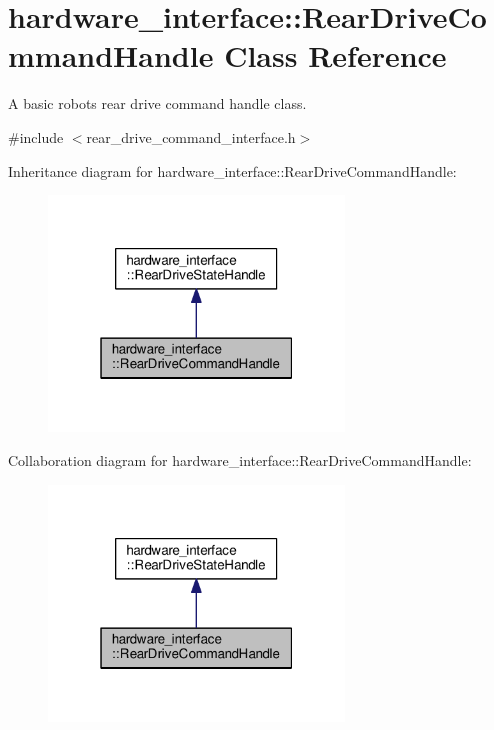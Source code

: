 \hypertarget{classhardware__interface_1_1RearDriveCommandHandle}{}\section{hardware\+\_\+interface\+:\+:Rear\+Drive\+Command\+Handle Class Reference}
\label{classhardware__interface_1_1RearDriveCommandHandle}


A basic robot\textquotesingle{}s rear drive command handle class.  




{\ttfamily \#include $<$rear\+\_\+drive\+\_\+command\+\_\+interface.\+h$>$}



Inheritance diagram for hardware\+\_\+interface\+:\+:Rear\+Drive\+Command\+Handle\+:\nopagebreak
\begin{figure}[H]
\begin{center}
\leavevmode
\includegraphics[width=223pt]{classhardware__interface_1_1RearDriveCommandHandle__inherit__graph}
\end{center}
\end{figure}


Collaboration diagram for hardware\+\_\+interface\+:\+:Rear\+Drive\+Command\+Handle\+:\nopagebreak
\begin{figure}[H]
\begin{center}
\leavevmode
\includegraphics[width=223pt]{classhardware__interface_1_1RearDriveCommandHandle__coll__graph}
\end{center}
\end{figure}
